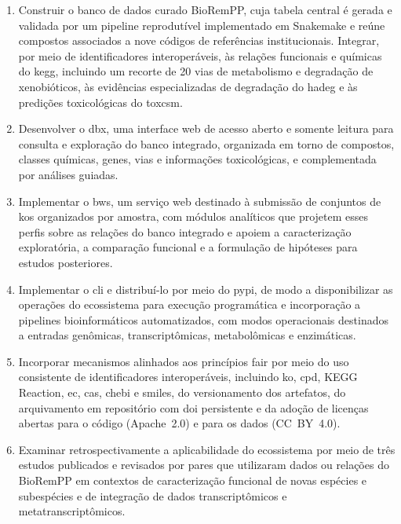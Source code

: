 \begin{enumerate}

    \item Construir o banco de dados curado BioRemPP, cuja tabela central é gerada
    e validada por um pipeline reprodutível implementado em Snakemake e reúne
    compostos associados a nove códigos de referências institucionais. Integrar,
    por meio de identificadores interoperáveis, às relações funcionais
    e químicas do \gls{kegg}, incluindo um recorte de 20 vias de metabolismo e
    degradação de xenobióticos, às evidências especializadas de degradação do
    \gls{hadeg} e às predições toxicológicas do \gls{toxcsm}.

    \item Desenvolver o \gls{dbx}, uma interface web de acesso aberto e somente
    leitura para consulta e exploração do banco integrado, organizada em torno
    de compostos, classes químicas, genes, vias e informações toxicológicas, e
    complementada por análises guiadas.

    \item Implementar o \gls{bws}, um serviço web destinado à submissão de
    conjuntos de \glspl{ko} organizados por amostra, com módulos analíticos que
    projetem esses perfis sobre as relações do banco integrado e apoiem a
    caracterização exploratória, a comparação funcional e a formulação de
    hipóteses para estudos posteriores.

    \item Implementar o \gls{cli} e distribuí-lo por meio do \gls{pypi}, de
    modo a disponibilizar as operações do ecossistema para execução
    programática e incorporação a pipelines bioinformáticos automatizados, com
    modos operacionais destinados a entradas genômicas, transcriptômicas,
    metabolômicas e enzimáticas.

    \item Incorporar mecanismos alinhados aos princípios \gls{fair} por meio do
    uso consistente de identificadores interoperáveis, incluindo \gls{ko},
    \gls{cpd}, KEGG Reaction, \gls{ec}, \gls{cas}, \gls{chebi} e
    \gls{smiles}, do versionamento dos artefatos, do arquivamento em repositório
    com \gls{doi} persistente e da adoção de licenças abertas para o código
    (Apache~2.0) e para os dados (CC~BY~4.0).

    \item Examinar retrospectivamente a aplicabilidade do ecossistema por meio
    de três estudos publicados e revisados por pares que utilizaram dados ou
    relações do BioRemPP em contextos de caracterização funcional de novas
    espécies e subespécies e de integração de dados transcriptômicos e
    metatranscriptômicos.

\end{enumerate}

